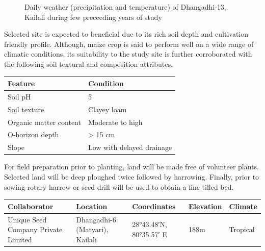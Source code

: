 \documentclass[
]{article}
\begin{document}
\begin{figure}

{\centering {}

}

\caption{Daily weather (precipitation and temperature) of Dhangadhi-13, Kailali during few preceeding years of study}\label{fig:climatology-matyari-dhangadhi}
\end{figure}

Selected site is expected to beneficial due to its rich soil depth and cultivation friendly profile. Although, maize crop is said to perform well on a wide range of climatic conditions, its suitability to the study site is further corroborated with the following soil textural and composition attributes.

\begin{tabular}{ll}
\toprule
Feature & Condition\\
\midrule
Soil pH & 5\\
Soil texture & Clayey loam\\
Organic matter content & Moderate to high\\
O-horizon depth & > 15 cm\\
Slope & Low with delayed drainage\\
\bottomrule
\end{tabular}

For field preparation prior to planting, land will be made free of volunteer plants. Selected land will be deep ploughed twice followed by harrowing. Finally, prior to sowing rotary harrow or seed drill will be used to obtain a fine tilled bed.

\begin{table}[H]
\centering\begingroup\fontsize{10}{12}\selectfont

\begin{tabular}{>{\raggedright\arraybackslash}p{10em}>{\raggedright\arraybackslash}p{10em}lll}
\toprule
Collaborator & Location & Coordinates & Elevation & Climate\\
\midrule
\rowcolor{gray!6}  Unique Seed Company Private Limited & Dhangadhi-6 (Matyari), Kailali & \ang{28;43.48;}N, \ang{80;35.57;} E & 188m & Tropical\\
\bottomrule
\end{tabular}
\endgroup{}
\end{table}
\end{document}
